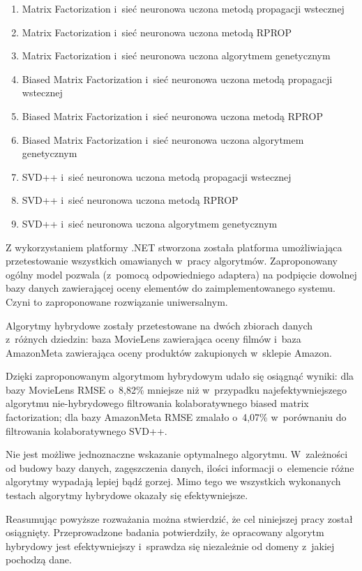 \documentclass[twoside]{iisthesis}
\begin{document}
	\begin{enumerate}
		\item Matrix Factorization i~sieć neuronowa uczona metodą propagacji wstecznej
		\item Matrix Factorization i~sieć neuronowa uczona metodą RPROP
		\item Matrix Factorization i~sieć neuronowa uczona algorytmem genetycznym
		\item Biased Matrix Factorization i~sieć neuronowa uczona metodą propagacji wstecznej
		\item Biased Matrix Factorization i~sieć neuronowa uczona metodą RPROP
		\item Biased Matrix Factorization i~sieć neuronowa uczona algorytmem genetycznym
		\item SVD++ i~sieć neuronowa uczona metodą propagacji wstecznej
		\item SVD++ i~sieć neuronowa uczona metodą RPROP
		\item SVD++ i~sieć neuronowa uczona algorytmem genetycznym
	\end{enumerate}
	
	Z wykorzystaniem platformy .NET stworzona została platforma umożliwiająca przetestowanie wszystkich omawianych w~pracy algorytmów. Zaproponowany ogólny model pozwala (z~pomocą odpowiedniego adaptera) na podpięcie dowolnej bazy danych zawierającej oceny elementów do zaimplementowanego systemu. Czyni to zaproponowane rozwiązanie uniwersalnym.
	
	Algorytmy hybrydowe zostały przetestowane na dwóch zbiorach danych z~różnych dziedzin: baza MovieLens zawierająca oceny filmów i~baza AmazonMeta zawierająca oceny produktów zakupionych w~sklepie Amazon. 
	
	Dzięki zaproponowanym algorytmom hybrydowym udało się osiągnąć wyniki: dla bazy MovieLens RMSE o~8,82\% mniejsze niż w~przypadku najefektywniejszego algorytmu nie-hybrydowego filtrowania kolaboratywnego biased matrix factorization; dla bazy AmazonMeta RMSE zmalało o~4,07\% w~porównaniu do filtrowania kolaboratywnego SVD++. 
	
	Nie jest możliwe jednoznaczne wskazanie optymalnego algorytmu. W~zależności od budowy bazy danych, zagęszczenia danych, ilości informacji o~elemencie różne algorytmy wypadają lepiej bądź gorzej.  Mimo tego we wszystkich wykonanych testach algorytmy hybrydowe okazały się efektywniejsze.
	
	Reasumując powyższe rozważania można stwierdzić, że cel niniejszej pracy został osiągnięty. Przeprowadzone badania potwierdziły, że opracowany algorytm hybrydowy jest efektywniejszy i~sprawdza się niezależnie od domeny z~jakiej pochodzą dane. 

	



\clearpage




\end{document}
